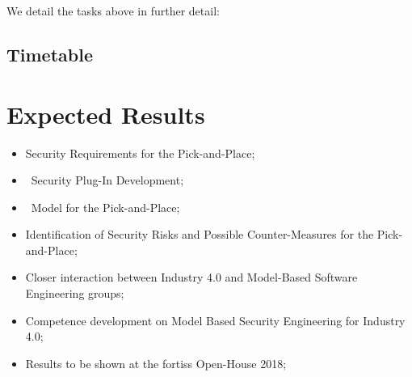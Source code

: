 We detail the tasks above in further detail:

\subsection{Timetable}


\section{Expected Results}

\begin{itemize}
  \item Security Requirements for the Pick-and-Place;
  \item \autofocus\ Security Plug-In Development;
  \item \autofocus\ Model for the Pick-and-Place;
  \item Identification of Security Risks and Possible Counter-Measures for the Pick-and-Place;
  \item Closer interaction between Industry 4.0 and Model-Based Software Engineering groups;
  \item Competence development on Model Based Security Engineering for Industry 4.0;
  \item Results to be shown at the fortiss Open-House 2018;
\end{itemize}

 


